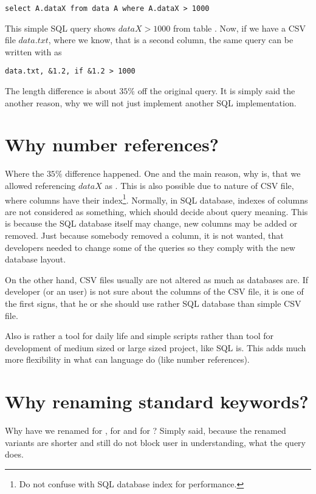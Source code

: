 \begin{verbatim}
select A.dataX from data A where A.dataX > 1000
\end{verbatim}

This simple SQL query shows $dataX > 1000$ from table . 
Now, if we have a CSV file $data.txt$, where we know, that  is a second column, the same query can 
be written with  as

\begin{verbatim}
data.txt, &1.2, if &1.2 > 1000
\end{verbatim}

The length difference is about $35\%$ off the original query. It is simply said the another reason, 
why we will not just implement another SQL implementation.

\section{Why number references?}
Where the $35\%$ difference happened. One and the main reason, why is, that we allowed referencing $dataX$ as .
This is also possible due to nature of CSV file, where columns have their index\footnote{Do not confuse with SQL database index for performance.}. 
Normally, in SQL database, indexes of columns are not considered as something, which should decide about query meaning.
This is because the SQL database itself may change, new columns may be added or removed. Just because somebody removed a column, 
it is not wanted, that developers needed to change some of the queries so they comply with the new database layout.

On the other hand, CSV files usually are not altered as much as databases are. 
If developer (or an user) is not sure about the columns of the CSV file, it is one of the first signs, that
he or she should use rather SQL database than simple CSV file.

Also  is rather a tool for daily life and simple scripts rather than tool for development of medium sized or
large sized project, like SQL is. This adds much more flexibility in what can language do (like number references).

\section{Why renaming standard keywords?}
Why have we renamed  for ,  for  and  for ? Simply said, because the renamed variants are shorter and still do not block user in understanding, what the query does.

